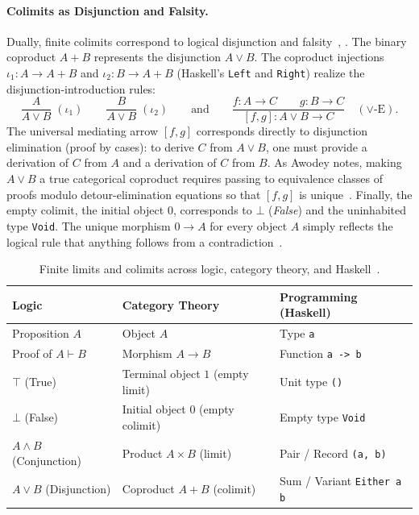 \paragraph{Colimits as Disjunction and Falsity.}
Dually, finite colimits correspond to logical disjunction and falsity~\cite[Sec.~3.2, Ex.~3.8]{Awodey10}, \cite[Sec.~9.6]{Milewski18}. The binary coproduct $A + B$ represents the disjunction $A \lor B$. The coproduct injections $\iota_1 \colon A \to A + B$ and $\iota_2 \colon B \to A + B$ (Haskell's \texttt{Left} and \texttt{Right}) realize the disjunction-introduction rules:
\[
  \frac{A}{A \lor B} \; (\iota_1)
  \qquad
  \frac{B}{A \lor B} \; (\iota_2)
  \qquad\text{and}\qquad
  \frac{f \colon A \to C \qquad g \colon B \to C}
       {[f, g] \colon A \lor B \to C}
  \quad (\lor\text{-E}).
\]
The universal mediating arrow $[f, g]$ corresponds directly to disjunction elimination (proof by cases): to derive $C$ from $A \lor B$, one must provide a derivation of $C$ from $A$ and a derivation of $C$ from $B$. As Awodey notes, making $A \lor B$ a true categorical coproduct requires passing to equivalence classes of proofs modulo detour-elimination equations so that $[f, g]$ is unique~\cite[Sec.~3.2, Ex.~3.8]{Awodey10}. Finally, the empty colimit, the initial object $0$, corresponds to $\bot$ (\emph{False}) and the uninhabited type \texttt{Void}. The unique morphism $0 \to A$ for every object $A$ simply reflects the logical rule that anything follows from a contradiction~\cite[Sec.~9.6]{Milewski18}.

\begin{table}[tb]
  \centering
  \begin{tabular}{@{}lll@{}}
    \toprule
    \textbf{Logic} & \textbf{Category Theory} & \textbf{Programming (Haskell)} \\
    \midrule
    Proposition $A$ & Object $A$ & Type \texttt{a} \\
    Proof of $A \vdash B$ & Morphism $A \to B$ & Function \texttt{a -> b} \\
    $\top$ (True) & Terminal object $1$ (empty limit) & Unit type \texttt{()} \\
    $\bot$ (False) & Initial object $0$ (empty colimit) & Empty type \texttt{Void} \\
    $A \land B$ (Conjunction) & Product $A \times B$ (limit) & Pair / Record \texttt{(a, b)} \\
    $A \lor B$ (Disjunction) & Coproduct $A + B$ (colimit) & Sum / Variant \texttt{Either a b} \\
    \bottomrule
  \end{tabular}
  \caption{Finite limits and colimits across logic, category theory, and Haskell~\cite{Awodey10,Milewski18}.}
  \label{tab:curry-howard}
\end{table}

